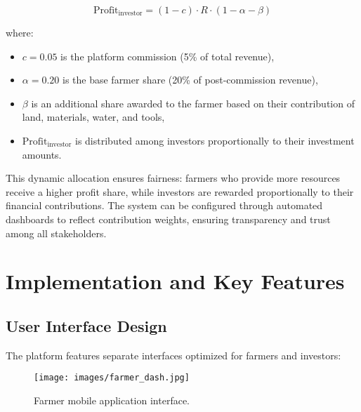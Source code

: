 \documentclass[9pt,twocolumn,twoside]{article}
\begin{document}
\begin{equation}
    \text{Profit}_{\text{investor}} = (1 - c) \cdot R \cdot (1 - \alpha - \beta)
    \label{eq:investor_profit}
\end{equation}

where:
\begin{itemize}
    \item $c = 0.05$ is the platform commission (5\% of total revenue),
    \item $\alpha = 0.20$ is the base farmer share (20\% of post-commission revenue),
    \item $\beta$ is an additional share awarded to the farmer based on their contribution of land, materials, water, and tools,
    \item $\text{Profit}_{\text{investor}}$ is distributed among investors proportionally to their investment amounts.
\end{itemize}

This dynamic allocation ensures fairness: farmers who provide more resources receive a higher profit share, while investors are rewarded proportionally to their financial contributions. The system can be configured through automated dashboards to reflect contribution weights, ensuring transparency and trust among all stakeholders.



\section{Implementation and Key Features} \label{sec:implementation}

\subsection{User Interface Design}

The platform features separate interfaces optimized for farmers and investors:


\begin{figure}[H]
\centering
\texttt{[image: images/farmer\_dash.jpg]}
\caption{Farmer mobile application interface.}
\label{fig:farmer_ui}
\end{figure}
\end{document}
